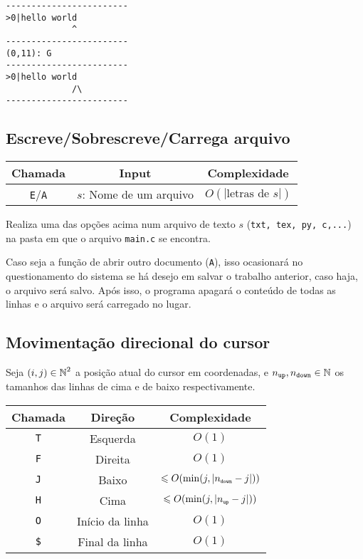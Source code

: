 \documentclass[a4paper, 11pt]{article}
\begin{document}
\begin{center}
      \begin{minipage}{0.45\linewidth}
\begin{lstlisting}[caption={Mudança do estilo do cursor}, label={muda_cursor}, language={[ansi]C},firstnumber=1]
------------------------
>0|hello world
             ^
------------------------
(0,11): G
------------------------
>0|hello world
             /\
------------------------
\end{lstlisting}
      \end{minipage}
\end{center}

\subsection{Escreve/Sobrescreve/Carrega arquivo}

\begin{table}[H]
\centering
\begin{tabular}{|c|c|c|}
\hline
\textbf{Chamada} & \textbf{Input} & \textbf{Complexidade}
\\ 
\hline
\texttt{E}/\texttt{A} & $s$: Nome de um arquivo & $O(|\text{letras de }s|)$ \\
\hline
\end{tabular}
\end{table}

Realiza uma das opções acima num arquivo de texto $s$ (\texttt{txt, tex, py, c,...}) na pasta em que o arquivo \texttt{main.c} se encontra.

Caso seja a função de abrir outro documento (\texttt{A}), isso ocasionará no questionamento do sistema se há desejo em salvar o trabalho anterior, caso haja, o arquivo será salvo. Após isso, o programa apagará o conteúdo de todas as linhas e o arquivo será carregado no lugar.

\subsection{Movimentação direcional do cursor}

Seja $(i,j) \in \operatorname{\mathbb{N}}^2$ a posição atual do cursor em coordenadas, e $n_{\texttt{up}}, n_{\texttt{down}} \in \operatorname{\mathbb{N}}$ os tamanhos das linhas de cima e de baixo respectivamente.
\begin{table}[H]
\centering
\begin{tabular}{|c|c|c|}
\hline
\textbf{Chamada} & \textbf{Direção} & \textbf{Complexidade}
\\ 
\hline
\texttt{T} & Esquerda  & $O(1)$ \\
\texttt{F} & Direita  & $O(1)$ \\
\texttt{J} & Baixo  & $\leqslant O( \min(j, |\sub n{\texttt{down}}- j|))$ \\
\texttt{H} & Cima  & $\leqslant O(\min(j, |\sub n{\texttt{up}}- j|))$ \\
\texttt{O} & Início da linha & $O(1)$ \\
\texttt{\$}& Final da linha  & $O(1)$ \\
\hline
\end{tabular}
\end{table}
\end{document}
